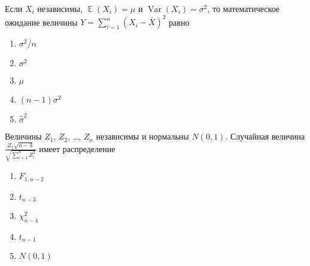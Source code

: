 \documentclass[t]{beamer}
\DeclareMathOperator{\Var}{Var}
\DeclareMathOperator{\E}{\mathbb{E}}
\begin{document}
 \begin{frame} \label{35} 
\begin{block}{35} 

Если $X_i$ независимы, $\E(X_i)=\mu$ и $\Var(X_i)=\sigma^2$, то математическое ожидание величины $Y=\sum_{i=1}^{n}(X_i-\bar{X})^2$ равно
 


 \end{block} 
\begin{enumerate} 
\item[] \hyperlink{35-No}{\beamergotobutton{} $\sigma^2/n$}
\item[] \hyperlink{35-No}{\beamergotobutton{} $\sigma^2$}
\item[] \hyperlink{35-No}{\beamergotobutton{} $\mu$}
\item[] \hyperlink{35-Yes}{\beamergotobutton{} $(n-1)\sigma^2$}
\item[] \hyperlink{35-No}{\beamergotobutton{} $\hat\sigma^2$}
\end{enumerate} 
\end{frame} 


 \begin{frame} \label{36} 
\begin{block}{36} 

Величины $Z_1$, $Z_2$, \ldots, $Z_n$ независимы и нормальны $N(0,1)$. Случайная величина $\frac{Z_1\sqrt{n-3}}{\sqrt{\sum_{i=4}^n Z_i^2}}$ имеет распределение
 


 \end{block} 
\begin{enumerate} 
\item[] \hyperlink{36-No}{\beamergotobutton{} $F_{1,n-2}$}
\item[] \hyperlink{36-Yes}{\beamergotobutton{} $t_{n-3}$}
\item[] \hyperlink{36-No}{\beamergotobutton{} $\chi^2_{n-4}$}
\item[] \hyperlink{36-No}{\beamergotobutton{} $t_{n-1}$}
\item[] \hyperlink{36-No}{\beamergotobutton{} $N(0,1)$}
\end{enumerate} 
\end{frame} 
\end{document}
